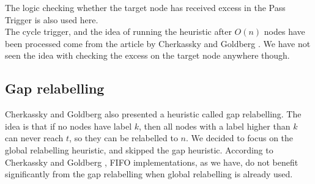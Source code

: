 The logic checking whether the target node has received excess in the Pass Trigger is also used here.\\

The cycle trigger, and the idea of running the heuristic after $O(n)$ nodes have been processed come from the article by Cherkassky and Goldberg \cite{CherkasskyGoldberg97}.
We have not seen the idea with checking the excess on the target node anywhere though.

\subsection{Gap relabelling}
Cherkassky and Goldberg \cite{CherkasskyGoldberg97} also presented a heuristic called gap relabelling.
The idea is that if no nodes have label $k$, then all nodes with a label higher than $k$ can never reach $t$, so they can be relabelled to $n$.
We decided to focus on the global relabelling heuristic, and skipped the gap heuristic. 
According to Cherkassky and Goldberg \cite{CherkasskyGoldberg97}, FIFO implementations, as we have, do not benefit significantly from the gap relabelling when global relabelling is already used.











